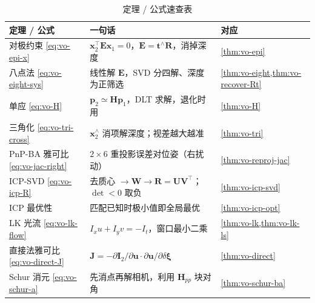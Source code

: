 \begin{table}[H]\centering\small
\caption{定理 / 公式速查表}
\begin{tabular}{lll}
\toprule
定理 / 公式 & 一句话 & 对应 \\
\midrule
对极约束 \cref{eq:vo-epi-x} & $\mathbf{x}_2^\top\mathbf{E}\mathbf{x}_1=0$，$\mathbf{E}=\mathbf{t}^\wedge\mathbf{R}$，消掉深度 & \cref{thm:vo-epi} \\
八点法 \cref{eq:vo-eight-sys} & 线性解 $\mathbf{E}$，SVD 分四解、深度为正筛选 & \cref{thm:vo-eight,thm:vo-recover-Rt} \\
单应 \cref{eq:vo-H} & $\mathbf{p}_2\simeq\mathbf{H}\mathbf{p}_1$，DLT 求解，退化时用 & \cref{thm:vo-H} \\
三角化 \cref{eq:vo-tri-cross} & $\mathbf{x}_2^\wedge$ 消项解深度；视差越大越准 & \cref{thm:vo-tri} \\
PnP-BA 雅可比 \cref{eq:vo-jac-right} & $2\times6$ 重投影误差对位姿（右扰动） & \cref{thm:vo-reproj-jac} \\
ICP-SVD \cref{eq:vo-icp-R} & 去质心 $\to\mathbf{W}\to\mathbf{R}=\mathbf{U}\mathbf{V}^\top$；$\det<0$ 取负 & \cref{thm:vo-icp-svd} \\
ICP 最优性 & 匹配已知时极小值即全局最优 & \cref{thm:vo-icp-opt} \\
LK 光流 \cref{eq:vo-lk-flow} & $I_xu+I_yv=-I_t$，窗口最小二乘 & \cref{thm:vo-lk,thm:vo-lk-ls} \\
直接法雅可比 \cref{eq:vo-direct-J} & $\mathbf{J}=-\partial\mathbf{I}_2/\partial\mathbf{u}\cdot\partial\mathbf{u}/\partial\delta\boldsymbol{\xi}$ & \cref{thm:vo-direct} \\
Schur 消元 \cref{eq:vo-schur-a} & 先消点再解相机，利用 $\mathbf{H}_{pp}$ 块对角 & \cref{thm:vo-schur-ba} \\
\bottomrule
\end{tabular}
\end{table}

